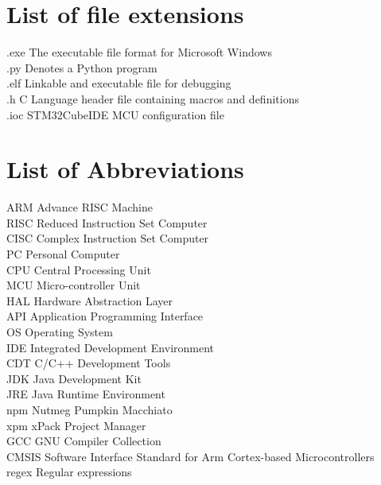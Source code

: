 \listoffigures
\newpage\cleardoublepage

\listoftables


\chapter*{List of file extensions}
\label{listExt}
.exe \Dotfill The executable file format for Microsoft Windows
\\
.py \Dotfill Denotes a Python program
\\
.elf \Dotfill Linkable and executable file for debugging 
\\
.h \Dotfill C Language header file containing macros and definitions
\\
.ioc \Dotfill STM32CubeIDE MCU configuration file
\\

\newpage\cleardoublepage

\chapter*{List of Abbreviations}
\label{listAbr}
ARM \Dotfill Advance RISC Machine
\\
RISC \Dotfill Reduced Instruction Set Computer 
\\
CISC \Dotfill Complex Instruction Set Computer 
\\
PC \Dotfill Personal Computer
\\
CPU \Dotfill Central Processing Unit
\\
MCU \Dotfill Micro-controller Unit
\\
HAL \Dotfill Hardware Abstraction Layer
\\
API \Dotfill Application Programming Interface
\\
OS \Dotfill Operating System
\\
IDE \Dotfill Integrated Development Environment 
\\
CDT \Dotfill C/C++ Development Tools
\\
JDK \Dotfill Java Development Kit 
\\
JRE \Dotfill Java Runtime Environment
\\
npm \Dotfill Nutmeg Pumpkin Macchiato 
\\
xpm \Dotfill xPack Project Manager
\\
GCC \Dotfill GNU Compiler Collection
\\
CMSIS \Dotfill Software Interface Standard for Arm Cortex-based Microcontrollers
\\
regex \Dotfill Regular expressions




\newpage\cleardoublepage